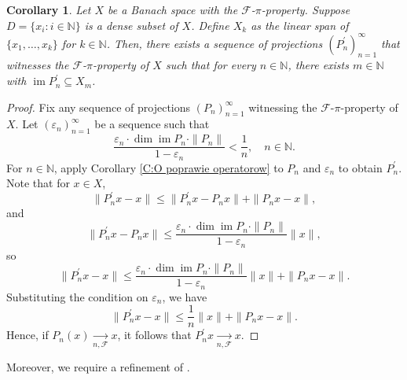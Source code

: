 \documentclass[12pt,fleqn]{amsart}
\renewcommand{\leq}{\leqslant}
\newtheorem{corollary}[theorem]{Corollary}
\theoremstyle{definition}
\theoremstyle{remark}
\begin{document}
\begin{corollary}\label{C:corrbase}
    Let \( X \) be a Banach space with the \( \mathcal{F} \)-\( \pi \)-property. Suppose \( D = \{x_i \colon i \in \mathbb{N}\} \) is a dense subset of \( X \). Define \( X_k \) as the linear span of \( \{x_1, \ldots, x_k\} \) for \( k \in \mathbb{N} \). Then, there exists a sequence of projections \( (P_n^\prime)_{n=1}^\infty \) that witnesses the \( \mathcal{F} \)-\( \pi \)-property of \( X \) such that for every \( n \in \mathbb{N} \), there exists \( m \in \mathbb{N} \) with \( \operatorname{im} P_n^\prime \subseteq X_m \).
\end{corollary}

\begin{proof}
    Fix any sequence of projections \( (P_n)_{n=1}^\infty \) witnessing the \( \mathcal{F} \)-\( \pi \)-property of \( X \). Let \( (\varepsilon_n)_{n=1}^\infty \) be a sequence such that 
    \[
    \frac{\varepsilon_n \cdot \dim \operatorname{im} P_n \cdot \|P_n\|}{1 - \varepsilon_n} < \frac{1}{n}, \quad n \in \mathbb{N}.
    \]
    For \( n \in \mathbb{N} \), apply Corollary \ref{C:O poprawie operatorow} to \( P_n \) and \( \varepsilon_n \) to obtain \( P_n^\prime \). Note that for \( x \in X \),
    \[
    \|P_n^\prime x - x\| \leq \|P_n^\prime x - P_n x\| + \|P_n x - x\|,
    \]
    and
    \[
    \|P_n^\prime x - P_n x\| \leq \frac{\varepsilon_n \cdot \dim \operatorname{im} P_n \cdot \|P_n\|}{1 - \varepsilon_n} \|x\|,
    \]
    so
    \[
    \|P_n^\prime x - x\| \leq \frac{\varepsilon_n \cdot \dim \operatorname{im} P_n \cdot \|P_n\|}{1 - \varepsilon_n} \|x\| + \|P_n x - x\|.
    \]
    Substituting the condition on \( \varepsilon_n \), we have
    \[
    \|P_n^\prime x - x\| \leq \frac{1}{n} \|x\| + \|P_n x - x\|.
    \]
    Hence, if \( P_n(x) \underset{n, \mathcal{F}}{\longrightarrow} x \), it follows that \( P_n^\prime x \underset{n, \mathcal{F}}{\longrightarrow} x \).
\end{proof}
%
Moreover, we require a refinement of \cite[Proposition 3.6]{CasazzaKalton}.
\end{document}
